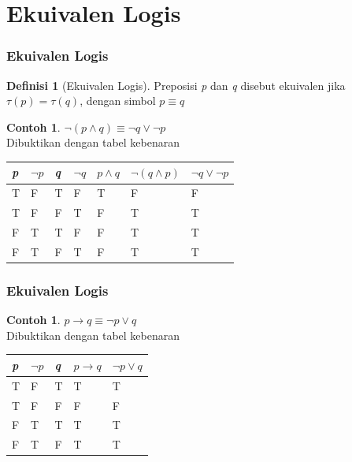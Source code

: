 \documentclass[handout]{beamer}
\theoremstyle{definition}
\newtheorem{definisi}[theorem]{Definisi}
\theoremstyle{example}
\newtheorem{contoh}[theorem]{Contoh}
\begin{document}
\section{Ekuivalen Logis}
\begin{frame}
   \frametitle{Ekuivalen Logis}
   \begin{definisi}[Ekuivalen Logis]
   	 Preposisi \textit{p} dan \textit{q} disebut ekuivalen jika $\tau(p)=\tau(q)$, dengan simbol $p \equiv q$
   \end{definisi}
   
   \begin{contoh}
   	$\neg(p \wedge q) \equiv \neg q \vee \neg p$\\
   	Dibuktikan dengan tabel kebenaran\\
   	\begin{tabular}{ | l | l | l | l | l | l | l |}
   		\hline
   		\textit{p} & $\neg p$& \textit{q} &$\neg q$& $p \wedge q$  & $\neg(q \wedge p)$& $\neg q \vee \neg p$\\ \hline
   		T & F & T & F & T & F & F \\ \hline
   		T & F & F & T & F & T & T  \\ \hline
   		F & T & T & F & F & T & T\\ \hline
   		F & T & F & T & F & T & T \\     		 
   		\hline
   	\end{tabular}
   \end{contoh}	
   
\end{frame}

\begin{frame}
	\frametitle{Ekuivalen Logis}	
	\begin{contoh}
		$p \rightarrow q \equiv \neg p \vee q$\\
		Dibuktikan dengan tabel kebenaran\\
		\begin{tabular}{ | l | l | l | l |l |}
			\hline
			\textit{p} & $\neg p$ &  \textit{q} & $p \rightarrow q$  & $\neg p \vee q$\\ \hline
			T & F & T & T & T  \\ \hline
			T & F & F & F & F   \\ \hline
			F & T & T & T & T \\ \hline
			F & T & F & T & T  \\     		 
			\hline
		\end{tabular}
	\end{contoh}
\end{frame}	
	
\end{document}
